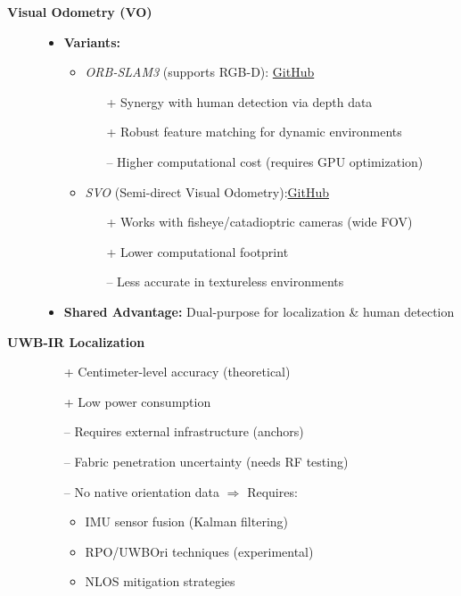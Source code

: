 \begin{description}
\item[\textbf{Visual Odometry (VO)}]
\hfill
\begin{itemize}[leftmargin=*,nosep]
    \item \textbf{Variants:}
    \begin{itemize}
        \item \textit{ORB-SLAM3} (supports RGB-D): \href{https://github.com/UZ-SLAMLab/ORB_SLAM3}{GitHub}
        \begin{itemize}
            \item[+] Synergy with human detection via depth data
            \item[+] Robust feature matching for dynamic environments
            \item[--] Higher computational cost (requires GPU optimization)
        \end{itemize}
        \item \textit{SVO} (Semi-direct Visual Odometry):\href{https://github.com/uzh-rpg/rpg_svo_pro_open}{GitHub}
        \begin{itemize}
            \item[+] Works with fisheye/catadioptric cameras (wide FOV)
            \item[+] Lower computational footprint
            \item[--] Less accurate in textureless environments
        \end{itemize}
    \end{itemize}
    \item \textbf{Shared Advantage:} Dual-purpose for localization \& human detection
\end{itemize}

\item[\textbf{UWB-IR Localization}]
\hfill
\begin{itemize}[leftmargin=*,nosep]
    \item[+] Centimeter-level accuracy (theoretical)
    \item[+] Low power consumption
    \item[--] Requires external infrastructure (anchors)
    \item[--] Fabric penetration uncertainty (needs RF testing)
    \item[--] No native orientation data $\Rightarrow$ Requires:
    \begin{itemize}
        \item IMU sensor fusion (Kalman filtering)
        \item RPO/UWBOri techniques (experimental)
        \item NLOS mitigation strategies
    \end{itemize}
\end{itemize}


\end{description}
